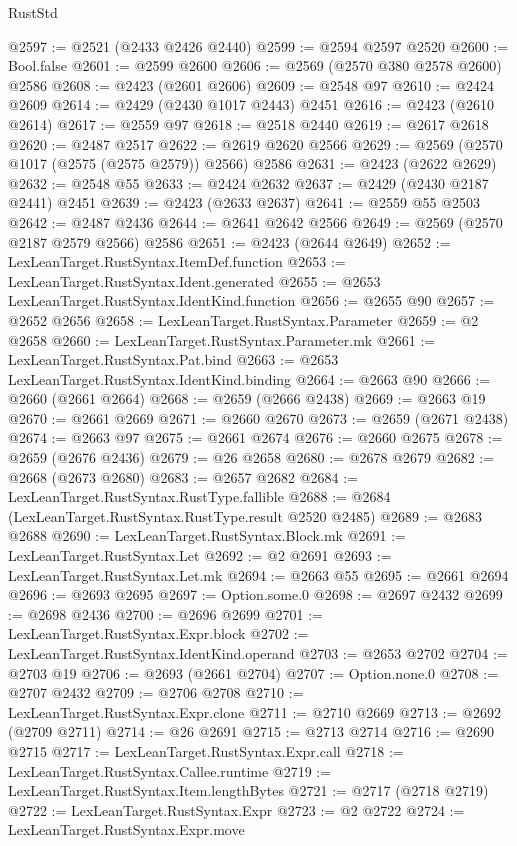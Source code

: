 \begin{lexlean}{RustStd}
\begin{coremodule}
@2597 := @2521 (@2433 @2426 @2440)
@2599 := @2594 @2597 @2520
@2600 := Bool.false
@2601 := @2599 @2600
@2606 := @2569 (@2570 @380 @2578 @2600) @2586
@2608 := @2423 (@2601 @2606)
@2609 := @2548 @97
@2610 := @2424 @2609
@2614 := @2429 (@2430 @1017 @2443) @2451
@2616 := @2423 (@2610 @2614)
@2617 := @2559 @97
@2618 := @2518 @2440
@2619 := @2617 @2618
@2620 := @2487 @2517
@2622 := @2619 @2620 @2566
@2629 := @2569 (@2570 @1017 (@2575 (@2575 @2579)) @2566) @2586
@2631 := @2423 (@2622 @2629)
@2632 := @2548 @55
@2633 := @2424 @2632
@2637 := @2429 (@2430 @2187 @2441) @2451
@2639 := @2423 (@2633 @2637)
@2641 := @2559 @55 @2503
@2642 := @2487 @2436
@2644 := @2641 @2642 @2566
@2649 := @2569 (@2570 @2187 @2579 @2566) @2586
@2651 := @2423 (@2644 @2649)
@2652 := LexLeanTarget.RustSyntax.ItemDef.function
@2653 := LexLeanTarget.RustSyntax.Ident.generated
@2655 := @2653 LexLeanTarget.RustSyntax.IdentKind.function
@2656 := @2655 @90
@2657 := @2652 @2656
@2658 := LexLeanTarget.RustSyntax.Parameter
@2659 := @2 @2658
@2660 := LexLeanTarget.RustSyntax.Parameter.mk
@2661 := LexLeanTarget.RustSyntax.Pat.bind
@2663 := @2653 LexLeanTarget.RustSyntax.IdentKind.binding
@2664 := @2663 @90
@2666 := @2660 (@2661 @2664)
@2668 := @2659 (@2666 @2438)
@2669 := @2663 @19
@2670 := @2661 @2669
@2671 := @2660 @2670
@2673 := @2659 (@2671 @2438)
@2674 := @2663 @97
@2675 := @2661 @2674
@2676 := @2660 @2675
@2678 := @2659 (@2676 @2436)
@2679 := @26 @2658
@2680 := @2678 @2679
@2682 := @2668 (@2673 @2680)
@2683 := @2657 @2682
@2684 := LexLeanTarget.RustSyntax.RustType.fallible
@2688 := @2684 (LexLeanTarget.RustSyntax.RustType.result @2520 @2485)
@2689 := @2683 @2688
@2690 := LexLeanTarget.RustSyntax.Block.mk
@2691 := LexLeanTarget.RustSyntax.Let
@2692 := @2 @2691
@2693 := LexLeanTarget.RustSyntax.Let.mk
@2694 := @2663 @55
@2695 := @2661 @2694
@2696 := @2693 @2695
@2697 := Option.some.{0}
@2698 := @2697 @2432
@2699 := @2698 @2436
@2700 := @2696 @2699
@2701 := LexLeanTarget.RustSyntax.Expr.block
@2702 := LexLeanTarget.RustSyntax.IdentKind.operand
@2703 := @2653 @2702
@2704 := @2703 @19
@2706 := @2693 (@2661 @2704)
@2707 := Option.none.{0}
@2708 := @2707 @2432
@2709 := @2706 @2708
@2710 := LexLeanTarget.RustSyntax.Expr.clone
@2711 := @2710 @2669
@2713 := @2692 (@2709 @2711)
@2714 := @26 @2691
@2715 := @2713 @2714
@2716 := @2690 @2715
@2717 := LexLeanTarget.RustSyntax.Expr.call
@2718 := LexLeanTarget.RustSyntax.Callee.runtime
@2719 := LexLeanTarget.RustSyntax.Item.lengthBytes
@2721 := @2717 (@2718 @2719)
@2722 := LexLeanTarget.RustSyntax.Expr
@2723 := @2 @2722
@2724 := LexLeanTarget.RustSyntax.Expr.move

\end{coremodule}
\end{lexlean}
